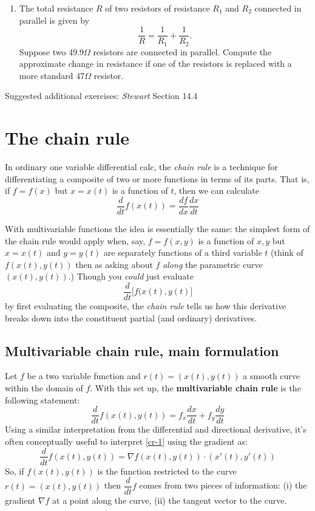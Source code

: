 \documentclass[12pt]{article}
\numberwithin{equation}{subsection}
\numberwithin{figure}{subsection}
\theoremstyle{note}
\begin{document}
{\begin{enumerate}[label=\arabic*.]

\item The total resistance $R$ of two resistors of resistance $R_1$ and $R_2$ connected in parallel is given by \[ \dfrac{1}{R}=\dfrac{1}{R_1}+\dfrac{1}{R_2}.\] Suppose two 49.9$\Omega$ resistors are connected in parallel. Compute the approximate change in resistance if one of the resistors is replaced with a more standard 47$\Omega$ resistor. 
\end{enumerate}



Suggested additional exercises: \textit{Stewart} Section 14.4 


\section{The chain rule}

In ordinary one variable differential calc, the \textit{chain rule} is a technique for differentiating a composite of two or more functions in terms of its parts. That is, if $f=f(x)$ but $x=x(t)$ is a function of $t$, then we can calculate \begin{equation} \dfrac{d}{dt} f(x(t))= \dfrac{df}{dx} \dfrac{dx}{dt}\end{equation}

With multivariable functions the idea is essentially the same: the simplest form of the chain rule would apply when, say, $f=f(x,y)$ is a function of $x,y$ but $x=x(t)$ and $y=y(t)$ are separately functions of a third variable $t$ (think of $f(x(t),y(t))$ then as asking about $f$ \textit{along} the parametric curve $(x(t),y(t))$.) Though you \textit{could} just evaluate \[\dfrac{d}{dt} \lbrack f(x(t),y(t)\rbrack\] by first evaluating the composite, the \textit{chain rule} tells us how this derivative breaks down into the constituent partial (and ordinary) derivatives. 

\subsection{Multivariable chain rule, main formulation} Let $f$ be a two variable function and $r(t)=(x(t),y(t))$ a smooth curve within the domain of $f$. With this set up, the \textbf{multivariable chain rule} is the following statement: 
\begin{equation} \dfrac{d}{dt} f(x(t),y(t))=f_x \dfrac{dx}{dt} + f_y \dfrac{dy}{dt} \label{cr-1}\end{equation}
Using a similar interpretation from the differential and directional derivative, it's often conceptually useful to interpret \eqref{cr-1} using the gradient as: \[ \dfrac{d}{dt} f(x(t),y(t)) = \nabla f(x(t),y(t)) \cdot (x'(t), y'(t)) \] So, if $f(x(t),y(t))$ is the function restricted to the curve $r(t)=(x(t),y(t))$ then $\dfrac{d}{dt} f$ comes from two pieces of information: (i) the gradient $\nabla f$ at a point along the curve, (ii) the tangent vector to the curve.


}
\end{document}
